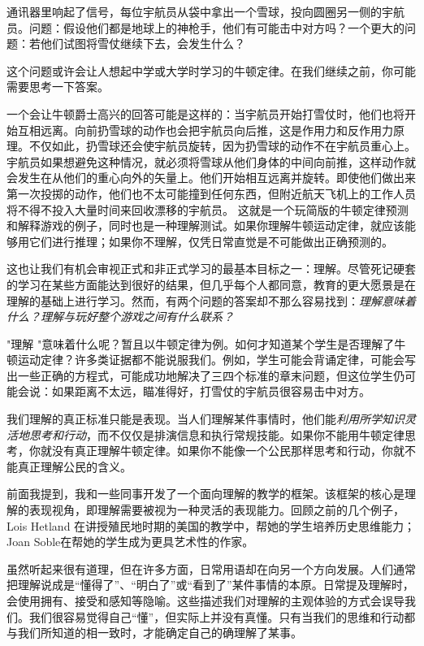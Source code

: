 通讯器里响起了信号，每位宇航员从袋中拿出一个雪球，投向圆圈另一侧的宇航员。问题：假设他们都是地球上的神枪手，他们有可能击中对方吗？一个更大的问题：若他们试图将雪仗继续下去，会发生什么？

这个问题或许会让人想起中学或大学时学习的牛顿定律。在我们继续之前，你可能需要思考一下答案。

一个会让牛顿爵士高兴的回答可能是这样的：当宇航员开始打雪仗时，他们也将开始互相远离。向前扔雪球的动作也会把宇航员向后推，这是作用力和反作用力原理。不仅如此，扔雪球还会使宇航员旋转，因为扔雪球的动作不在宇航员重心上。宇航员如果想避免这种情况，就必须将雪球从他们身体的中间向前推，这样动作就会发生在从他们的重心向外的矢量上。他们开始相互远离并旋转。即使他们做出来第一次投掷的动作，他们也不太可能撞到任何东西，但附近航天飞机上的工作人员将不得不投入大量时间来回收漂移的宇航员。
这就是一个玩简版的牛顿定律预测和解释游戏的例子，同时也是一种理解测试。如果你理解牛顿运动定律，就应该能够用它们进行推理；如果你不理解，仅凭日常直觉是不可能做出正确预测的。

这也让我们有机会审视正式和非正式学习的最基本目标之一：理解。尽管死记硬套的学习在某些方面能达到很好的结果，但几乎每个人都同意，教育的更大愿景是在理解的基础上进行学习。然而，有两个问题的答案却不那么容易找到：\textit{理解意味着什么？理解与玩好整个游戏之间有什么联系？}

"理解 "意味着什么呢？暂且以牛顿定律为例。如何才知道某个学生是否理解了牛顿运动定律？许多类证据都不能说服我们。例如，学生可能会背诵定律，可能会写出一些正确的方程式，可能成功地解决了三四个标准的章末问题，但这位学生仍可能会说：如果距离不太远，瞄准得好，打雪仗的宇航员很容易击中对方。

我们理解的真正标准只能是表现。当人们理解某件事情时，他们能\textit{利用所学知识灵活地思考和行动}，而不仅仅是排演信息和执行常规技能。如果你不能用牛顿定律思考，你就没有真正理解牛顿定律。如果你不能像一个公民那样思考和行动，你就不能真正理解公民的含义。

前面我提到，我和一些同事开发了一个面向理解的教学的框架。该框架的核心是理解的表现视角，即理解需要被视为一种灵活的表现能力。回顾之前的几个例子，Lois Hetland 在讲授殖民地时期的美国的教学中，帮她的学生培养历史思维能力；Joan Soble在帮她的学生成为更具艺术性的作家。

虽然听起来很有道理，但在许多方面，日常用语却在向另一个方向发展。人们通常把理解说成是“懂得了”、“明白了”或“看到了”某件事情的本原。日常提及理解时，会使用拥有、接受和感知等隐喻。这些描述我们对理解的主观体验的方式会误导我们。我们很容易觉得自己“懂”，但实际上并没有真懂。只有当我们的思维和行动都与我们所知道的相一致时，才能确定自己的确理解了某事。

